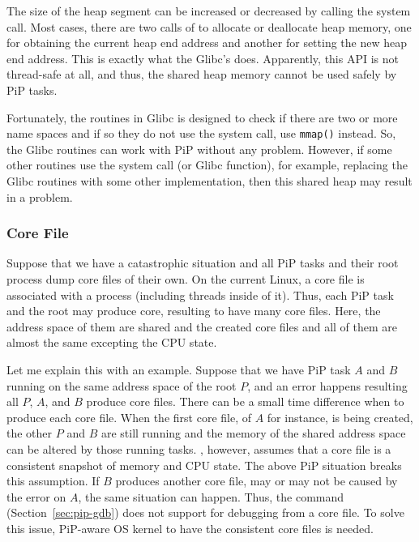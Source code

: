 The size of the heap segment can be increased or decreased by calling
the  system call. Most cases, there are two calls of
 to allocate or deallocate heap memory, one for
obtaining the 
current heap end address and another for setting the new heap end 
address. This is exactly what the Glibc's 
does. Apparently, this API is not thread-safe at all, and thus, 
the shared heap memory cannot be used safely by PiP tasks.

Fortunately, the  routines in Glibc is designed to check if
there are two or more name spaces and if so they do not use the
 system call, use {\tt mmap()} instead. So, the Glibc
 routines can work with PiP without any
problem. However, if some other routines use the 
system call (or  Glibc function), for example,
replacing the Glibc  routines with some other
 implementation, then this shared heap may result in a 
problem.

\subsubsection{Core File}

Suppose that we have a catastrophic situation and all PiP tasks and
their root process dump core files of their own. On the current Linux,
a core file is associated with a process (including threads inside of
it). Thus, each PiP task and the root may produce core, resulting to
have many core files. Here, the address space of them are shared and
the created core files and all of them are almost the same excepting
the CPU state. 

Let me explain this with an example. Suppose that we have PiP task $A$
and $B$ running on the same address space of the root $P$, and an
error happens resulting all $P$, $A$, and $B$ produce core
files. There can be a small time difference when to produce each core
file. When the first core file, of $A$ for instance, is being created,
the other $P$ and $B$ are still running and the memory of the shared 
address space can be altered by those running tasks.
, however, assumes that a core file is a consistent snapshot
of memory and CPU state. The above PiP situation breaks this
assumption. If $B$ produces another core file, may or may not be
caused by the error on $A$, the same situation can happen.
Thus, the  command (Section~\ref{sec:pip-gdb}) does
not support for debugging from a core file. To solve this issue,
PiP-aware OS kernel to have the consistent core files is needed. 

